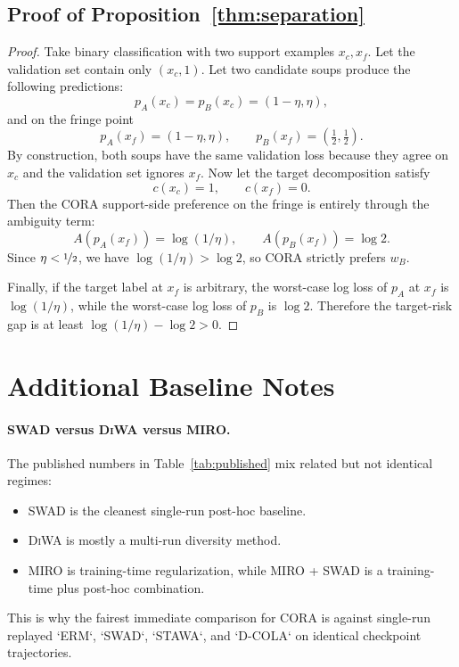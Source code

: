 \documentclass{article}
\newcommand{\cora}{\textup{\textsc{CORA}}}
\newcommand{\swad}{\textup{\textsc{SWAD}}}
\newcommand{\stawa}{\textup{\textsc{STAWA}}}
\newcommand{\dcola}{\textup{\textsc{D-COLA}}}
\newcommand{\diwa}{\textup{\textsc{DiWA}}}
\newcommand{\miro}{\textup{\textsc{MIRO}}}
\begin{document}
\subsection{Proof of Proposition~\ref{thm:separation}}

\begin{proof}
Take binary classification with two support examples $x_c,x_f$. Let the validation set contain only $(x_c,1)$. Let two candidate soups produce the following predictions:
\[
    p_A(x_c)=p_B(x_c)=(1-\eta,\eta),
\]
and on the fringe point
\[
    p_A(x_f)=(1-\eta,\eta),
    \qquad
    p_B(x_f)=\left(\tfrac12,\tfrac12\right).
\]
By construction, both soups have the same validation loss because they agree on $x_c$ and the validation set ignores $x_f$.
Now let the target decomposition satisfy
\[
    c(x_c)=1,
    \qquad
    c(x_f)=0.
\]
Then the \cora{} support-side preference on the fringe is entirely through the ambiguity term:
\[
    A(p_A(x_f)) = \log(1/\eta),
    \qquad
    A(p_B(x_f)) = \log 2.
\]
Since $\eta < \nicefrac12$, we have $\log(1/\eta) > \log 2$, so \cora{} strictly prefers $w_B$.

Finally, if the target label at $x_f$ is arbitrary, the worst-case log loss of $p_A$ at $x_f$ is $\log(1/\eta)$, while the worst-case log loss of $p_B$ is $\log 2$. Therefore the target-risk gap is at least $\log(1/\eta)-\log 2 > 0$.
\end{proof}

\section{Additional Baseline Notes}

\paragraph{\swad{} versus \diwa{} versus \miro{}.}
The published numbers in Table~\ref{tab:published} mix related but not identical regimes:
\begin{itemize}[leftmargin=1.4em]
    \item \swad{} is the cleanest single-run post-hoc baseline.
    \item \diwa{} is mostly a multi-run diversity method.
    \item \miro{} is training-time regularization, while \miro{} + \swad{} is a training-time plus post-hoc combination.
\end{itemize}
This is why the fairest immediate comparison for \cora{} is against single-run replayed `ERM`, `\swad`, `\stawa`, and `\dcola` on identical checkpoint trajectories.
\end{document}
